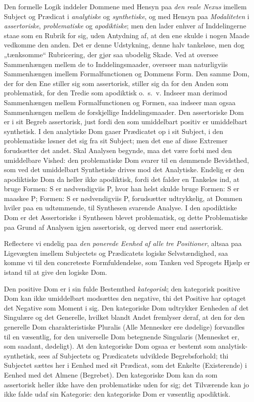 \documentclass[12pt]{book}
\newcommand{\opage}[1]{\marginnote{\footnotesize\textit{[#1]}}}
\begin{document}
Den formelle Logik inddeler Dommene med Hensyn paa \emph{den reale Nexus} imellem Subject og Prædicat i \emph{analytiske} og \emph{synthetiske}, og med Hensyn paa \emph{Modaliteten} i \emph{assertoriske}, \emph{problematiske} og \emph{apodiktiske}; men den lader enhver af Inddelingerne staae som en Rubrik for sig, uden Antydning af, at den ene skulde i nogen Maade vedkomme den anden. Det er denne Udstykning, denne halv tankeløse, men dog „tænksomme“ Rubricering, der gjør saa ubodelig Skade. Ved at oversee Sammenhængen mellem de to Inddelingsmaader, overseer man naturligviis Sammenhængen imellem Formalfunctionen og Dommens Form. Den samme Dom, der for den Ene stiller sig som assertorisk, stiller sig da for den Anden som problematisk, for den Tredie som apodiktisk o.~s.~v. Indseer man derimod Sammenhængen mellem Formalfunctionen og Formen, saa indseer man ogsaa Sammenhængen mellem de forskjellige Inddelingsmaader. Den assertoriske Dom er i sit Begreb assertorisk, just fordi den %
\opage{60}som umiddelbart positiv er umiddelbart synthetisk. I den analytiske Dom gaaer Prædicatet op i sit Subject, i den problematiske løsner det sig fra sit Subject; men det ene af disse Extremer forudsætter det andet. Skal Analysen begynde, maa det være forbi med den umiddelbare Vished: den problematiske Dom svarer til en dømmende Bevidsthed, som ved det umiddelbart Synthetiske drives mod det Analytiske. Endelig er den apodiktiske Dom da heller ikke apodiktisk, fordi det falder en Tankeløs ind, at bruge Formen: S er nødvendigviis P, hvor han helst skulde bruge Formen: S er maaskee P; Formen: S er nødvendigviis P, forudsætter udtrykkelig, at Dommen hviler paa en udtømmende, til Synthesen svarende Analyse. I den apodiktiske Dom er det Assertoriske i Synthesen blevet problematisk, og dette Problematiske paa Grund af Analysen igjen assertorisk, og derved meer end assertorisk.

Reflectere vi endelig paa \emph{den ponerede Eenhed af alle tre Positioner}, altsaa paa Ligevægten imellem Subjectets og Prædicatets logiske Selvstændighed, saa komme vi til den concreteste Formfuldendelse, som Tanken ved Sprogets Hjælp er istand til at give den logiske Dom.

Den positive Dom er i sin fulde Bestemthed \emph{kategorisk}; den kategorisk positive Dom kan ikke umiddelbart modsættes den negative, thi det Positive har optaget det Negative som Moment i sig. Den kategoriske Dom udtrykker Eenheden af det Singulære og det Generelle, hvilket blandt Andet fremlyser deraf, at den for den generelle Dom charakteristiske Pluralis (Alle Mennesker ere dødelige) forvandles til en væsentlig, for den universelle Dom betegnende Singularis (Mennesket er, som saadant, dødeligt). At den kategoriske Dom ogsaa er bestemt som analytisk-synthetisk, sees af Subjectets og Prædicatets udviklede Begrebsforhold; thi Subjectet sættes her i Eenhed med sit Prædicat, som det Enkelte (Existerende) i Eenhed med det Almene (Begrebet). Den kategoriske Dom kan da som assertorisk heller ikke have den problematiske uden%
\opage{61}for sig; det Tilværende kan jo ikke falde udaf sin Kategorie:
den kategoriske Dom er væsentlig apodiktisk.
\end{document}
